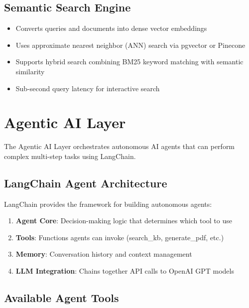 \documentclass[12pt,a4paper]{report}
\begin{document}
\subsection{Semantic Search Engine}

\begin{itemize}[label=\textbullet]
    \item Converts queries and documents into dense vector embeddings
    \item Uses approximate nearest neighbor (ANN) search via pgvector or Pinecone
    \item Supports hybrid search combining BM25 keyword matching with semantic similarity
    \item Sub-second query latency for interactive search
\end{itemize}

\section{Agentic AI Layer}

The Agentic AI Layer orchestrates autonomous AI agents that can perform complex multi-step tasks using LangChain.

\subsection{LangChain Agent Architecture}

LangChain provides the framework for building autonomous agents:

\begin{enumerate}
    \item \textbf{Agent Core}: Decision-making logic that determines which tool to use
    \item \textbf{Tools}: Functions agents can invoke (search\_kb, generate\_pdf, etc.)
    \item \textbf{Memory}: Conversation history and context management
    \item \textbf{LLM Integration}: Chains together API calls to OpenAI GPT models
\end{enumerate}

\subsection{Available Agent Tools}
\end{document}
